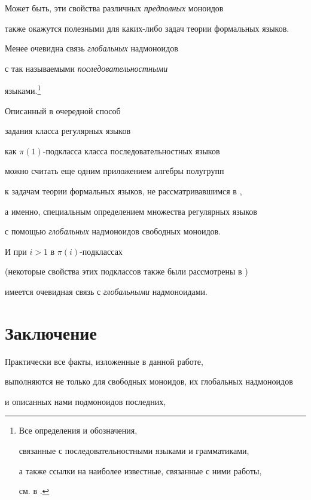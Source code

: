  Может быть, эти свойства различных {\it предполных\/} моноидов


 также окажутся полезными для каких-либо задач теории формальных языков.





 Менее очевидна связь {\it глобальных\/} надмоноидов


 с так называемыми {\it последовательностными\/} 


языками.\footnote{Все определения и обозначения,


связанные с последовательностными языками и грамматиками,


 а также ссылки на наиболее известные, связанные с ними работы,


 см. в \cite{io2}.}


 Описанный в \cite{io2} очередной способ


 задания класса регулярных языков


 как $\pi(1)$-подкласса класса последовательностных языков


 можно считать еще одним приложением алгебры полугрупп


 к задачам теории формальных языков, не рассматривавшимся в \cite{oa2},


 а именно, специальным определением множества регулярных языков


 с помощью {\it глобальных\/} надмоноидов свободных моноидов.


 И при $i>1$ в $\pi(i)$-подклассах


 (некоторые свойства этих подклассов также были рассмотрены в \cite{io2})


 имеется очевидная связь с {\it глобальными\/} надмоноидами.











 \section{Заключение} \label{zakl}





 Практически все факты, изложенные в данной работе,


 выполняются не только для свободных моноидов, их глобальных надмоноидов


 и описанных нами подмоноидов последних,


